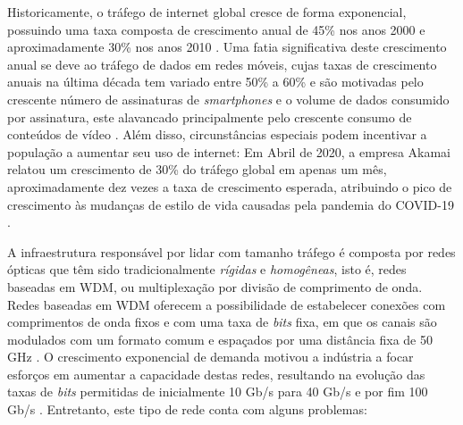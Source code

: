 

Historicamente, o tráfego de internet global cresce de forma exponencial, possuindo uma taxa composta de crescimento anual de 45\% nos anos 2000 \cite{network_evolution_2020} e aproximadamente 30\% nos anos 2010 \cite{cisco2011cisco, cisco2012cisco, cisco2013cisco, cisco2014cisco, cisco2015cisco, cisco2016cisco, cisco2017cisco, cisco2018cisco}. Uma fatia significativa deste crescimento anual se deve ao tráfego de dados em redes móveis, cujas taxas de crescimento anuais na última década tem variado entre 50\% a 60\% e são motivadas pelo crescente número de assinaturas de \textit{smartphones} e o volume de dados consumido por assinatura, este alavancado principalmente pelo crescente consumo de conteúdos de vídeo \cite{ericsson_mobility_report_2020}. Além disso, circunstâncias especiais podem incentivar a população a aumentar seu uso de internet: Em Abril de 2020, a empresa Akamai relatou um crescimento de 30\% do tráfego global em apenas um mês, aproximadamente dez vezes a taxa de crescimento esperada, atribuindo o pico de crescimento às mudanças de estilo de vida causadas pela pandemia do COVID-19 \cite{mckeay_2020}.

A infraestrutura responsável por lidar com tamanho tráfego é composta por redes ópticas que têm sido tradicionalmente \textit{rígidas} e \textit{homogêneas}, isto é, redes baseadas em \acrfull{WDM}, ou multiplexação por divisão de comprimento de onda. Redes baseadas em WDM oferecem a possibilidade de estabelecer conexões com comprimentos de onda fixos e com uma taxa de \textit{bits} fixa, em que os canais são modulados com um formato comum e espaçados por uma distância fixa de 50 GHz \cite{eon_tutorial_2014, jinno_eon_benefits}. O crescimento exponencial de demanda motivou a indústria a focar esforços em aumentar a capacidade destas redes, resultando na evolução das taxas de \textit{bits} permitidas de inicialmente 10 Gb/s para 40 Gb/s e por fim 100 Gb/s \cite{vizcaino_eon_energy}. Entretanto, este tipo de rede conta com alguns problemas:

